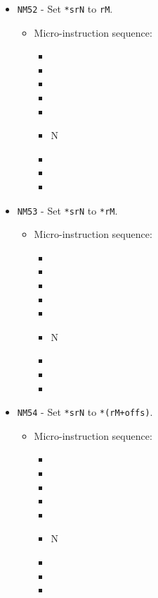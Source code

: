 \documentclass{article}
\begin{document}
\begin{itemize}
    \item \Verb|NM52| - Set \Verb|*srN| to \Verb|rM|.
    \begin{itemize}
        \item Micro-instruction sequence:
        \begin{itemize}
            \item \pkptroutinc
            \item \datatooffs
            \item \incrementpk
            \item \pkptroutinc
            \item \holddata
            \item \specialtoaddr N
            \item \writeRAMo
            \item \incrementpk
            \item \done
        \end{itemize}
    \end{itemize}
    
    \item \Verb|NM53| - Set \Verb|*srN| to \Verb|*rM|.
    \begin{itemize}
        \item Micro-instruction sequence:
        \begin{itemize}
            \item \pkptroutinc
            \item \datatooffs
            \item \incrementpk
            \item \pkptroutinc
            \item \holddata
            \item \specialtoaddr N
            \item \writeRAMo
            \item \incrementpk
            \item \done
        \end{itemize}
    \end{itemize}
    
    \item \Verb|NM54| - Set \Verb|*srN| to \Verb|*(rM+offs)|.
    \begin{itemize}
        \item Micro-instruction sequence:
        \begin{itemize}
            \item \pkptroutinc
            \item \datatooffs
            \item \incrementpk
            \item \pkptroutinc
            \item \holddata
            \item \specialtoaddr N
            \item \writeRAMo
            \item \incrementpk
            \item \done
        \end{itemize}
    \end{itemize}


\end{itemize}
\end{document}
